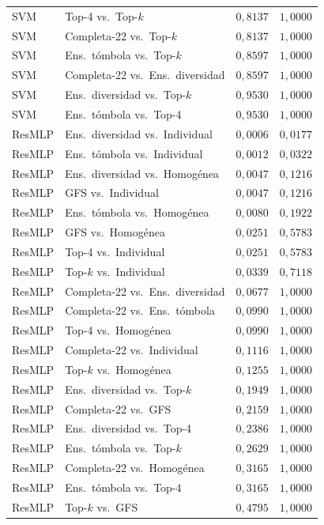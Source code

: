 \begin{table}[H]
\begin{tabular}{@{}llrr@{}}
SVM & Top-4 vs.\ Top-$k$ & $0{,}8137$ & $1{,}0000$ \\
SVM & Completa-22 vs.\ Top-$k$ & $0{,}8137$ & $1{,}0000$ \\
SVM & Ens.\ tómbola vs.\ Top-$k$ & $0{,}8597$ & $1{,}0000$ \\
SVM & Completa-22 vs.\ Ens.\ diversidad & $0{,}8597$ & $1{,}0000$ \\
SVM & Ens.\ diversidad vs.\ Top-$k$ & $0{,}9530$ & $1{,}0000$ \\
SVM & Ens.\ tómbola vs.\ Top-4 & $0{,}9530$ & $1{,}0000$ \\
ResMLP & Ens.\ diversidad vs.\ Individual & $0{,}0006$ & $0{,}0177$ \\
ResMLP & Ens.\ tómbola vs.\ Individual & $0{,}0012$ & $0{,}0322$ \\
ResMLP & Ens.\ diversidad vs.\ Homogénea & $0{,}0047$ & $0{,}1216$ \\
ResMLP & GFS vs.\ Individual & $0{,}0047$ & $0{,}1216$ \\
ResMLP & Ens.\ tómbola vs.\ Homogénea & $0{,}0080$ & $0{,}1922$ \\
ResMLP & GFS vs.\ Homogénea & $0{,}0251$ & $0{,}5783$ \\
ResMLP & Top-4 vs.\ Individual & $0{,}0251$ & $0{,}5783$ \\
ResMLP & Top-$k$ vs.\ Individual & $0{,}0339$ & $0{,}7118$ \\
ResMLP & Completa-22 vs.\ Ens.\ diversidad & $0{,}0677$ & $1{,}0000$ \\
ResMLP & Completa-22 vs.\ Ens.\ tómbola & $0{,}0990$ & $1{,}0000$ \\
ResMLP & Top-4 vs.\ Homogénea & $0{,}0990$ & $1{,}0000$ \\
ResMLP & Completa-22 vs.\ Individual & $0{,}1116$ & $1{,}0000$ \\
ResMLP & Top-$k$ vs.\ Homogénea & $0{,}1255$ & $1{,}0000$ \\
ResMLP & Ens.\ diversidad vs.\ Top-$k$ & $0{,}1949$ & $1{,}0000$ \\
ResMLP & Completa-22 vs.\ GFS & $0{,}2159$ & $1{,}0000$ \\
ResMLP & Ens.\ diversidad vs.\ Top-4 & $0{,}2386$ & $1{,}0000$ \\
ResMLP & Ens.\ tómbola vs.\ Top-$k$ & $0{,}2629$ & $1{,}0000$ \\
ResMLP & Completa-22 vs.\ Homogénea & $0{,}3165$ & $1{,}0000$ \\
ResMLP & Ens.\ tómbola vs.\ Top-4 & $0{,}3165$ & $1{,}0000$ \\
ResMLP & Top-$k$ vs.\ GFS & $0{,}4795$ & $1{,}0000$ \\

\end{tabular}
\end{table}
